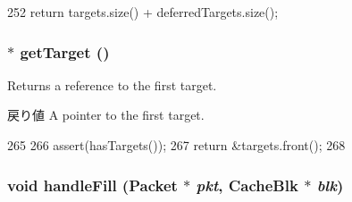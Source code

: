 \begin{DoxyCode}
252     { return targets.size() + deferredTargets.size(); }
\end{DoxyCode}
\hypertarget{classMSHR_ae068bab5bed8991efdfcd7829d9ca5e3}{
\subsubsection[{getTarget}]{$\ast$ getTarget ()}}
\label{classMSHR_ae068bab5bed8991efdfcd7829d9ca5e3}
Returns a reference to the first target. \begin{DoxyReturn}{戻り値}
A pointer to the first target. 
\end{DoxyReturn}



\begin{DoxyCode}
265     {
266         assert(hasTargets());
267         return &targets.front();
268     }
\end{DoxyCode}
\hypertarget{classMSHR_aff2dbaf9542ae841979f44a7af2fab0b}{
\subsubsection[{handleFill}]{\setlength{\rightskip}{0pt plus 5cm}void handleFill ({\bf Packet} $\ast$ {\em pkt}, \/  {\bf CacheBlk} $\ast$ {\em blk})}}
\label{classMSHR_aff2dbaf9542ae841979f44a7af2fab0b}




